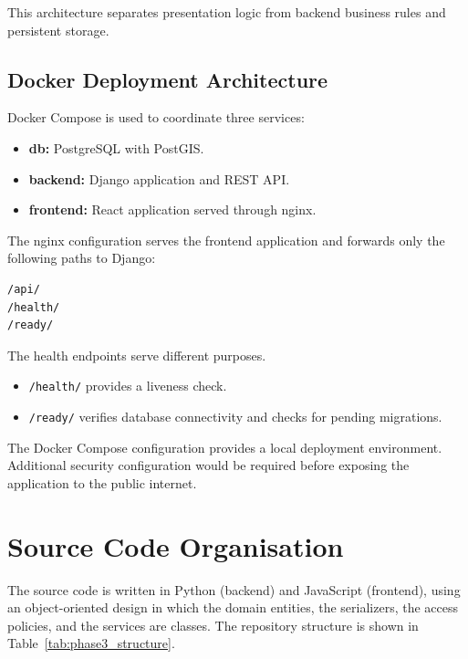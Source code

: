 \documentclass[11pt,a4paper]{article}
\begin{document}
This architecture separates presentation logic
from backend business rules and persistent storage.

\subsection{Docker Deployment Architecture}

Docker Compose is used to coordinate three services:

\begin{itemize}
    \item \textbf{db:} PostgreSQL with PostGIS.
    \item \textbf{backend:} Django application and REST API.
    \item \textbf{frontend:} React application served through nginx.
\end{itemize}

The nginx configuration serves the frontend application
and forwards only the following paths to Django:

\begin{lstlisting}
/api/
/health/
/ready/
\end{lstlisting}

The health endpoints serve different purposes.

\begin{itemize}
    \item \texttt{/health/} provides a liveness check.
    \item \texttt{/ready/} verifies database connectivity
    and checks for pending migrations.
\end{itemize}

The Docker Compose configuration provides a local
deployment environment. Additional security configuration
would be required before exposing the application
to the public internet.


\section{Source Code Organisation}

The source code is written in Python (backend) and JavaScript (frontend),
using an object-oriented design in which the domain entities, the
serializers, the access policies, and the services are classes.
The repository structure is shown in Table~\ref{tab:phase3_structure}.
\end{document}
